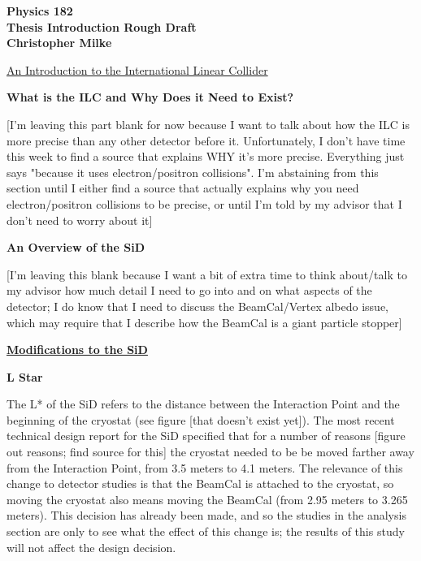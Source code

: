 \documentclass{article}
\begin{document}
    \begin{center}
        \bf{\large Physics 182 \\ Thesis Introduction Rough Draft \\ Christopher Milke}
    \end{center}


    \vspace{10mm}
    \begin{center}
        \underline{ \large An Introduction to the International Linear Collider }
    \end{center}
        \begin{center}
            \bf{What is the ILC and Why Does it Need to Exist?}
        \end{center}

        [I'm leaving this part blank for now because I want to talk about how the ILC is more precise than any other detector before it. Unfortunately, I don't have time this week to find a source that explains WHY it's more precise. Everything just says "because it uses electron/positron collisions". I'm abstaining from this section until I either find a source that actually explains why you need electron/positron collisions to be precise, or until I'm told by my advisor that I don't need to worry about it]

        \vspace{5mm}
        \begin{center}
            \bf{An Overview of the SiD}
        \end{center}

        [I'm leaving this blank because I want a bit of extra time to think about/talk to my advisor how much detail I need to go into and on what aspects of the detector; I do know that I need to discuss the BeamCal/Vertex albedo issue, which may require that I describe how the BeamCal is a giant particle stopper]



    \vspace{10mm}
    \begin{center}
        \underline{\bf{\large Modifications to the SiD}}
    \end{center}
        \begin{center}
            \bf{L Star}
        \end{center}

        The L* of the SiD refers to the distance between the Interaction Point and the beginning of the cryostat (see figure [that doesn't exist yet]). The most recent technical design report for the SiD specified that for a number of reasons [figure out reasons; find source for this] the cryostat needed to be be moved farther away from the Interaction Point, from 3.5 meters to 4.1 meters. The relevance of this change to detector studies is that the BeamCal is attached to the cryostat, so moving the cryostat also means moving the BeamCal (from 2.95 meters to 3.265 meters). This decision has already been made, and so the studies in the analysis section are only to see what the effect of this change is; the results of this study will not affect the design decision.
\end{document}
